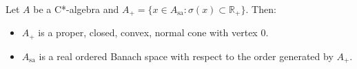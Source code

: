 Let $A$ be a C*-algebra and $A_+ = \{x \in A_{\mathrm{sa}} : \sigma(x) \subset \mathbb{R}_+\}$. Then:
\begin{itemize}
\item[(i)] $A_+$ is a proper, closed, convex, normal cone with vertex $0$.
\item[(ii)] $A_{\mathrm{sa}}$ is a real ordered Banach space with respect to the order generated by $A_+$.
\end{itemize}
